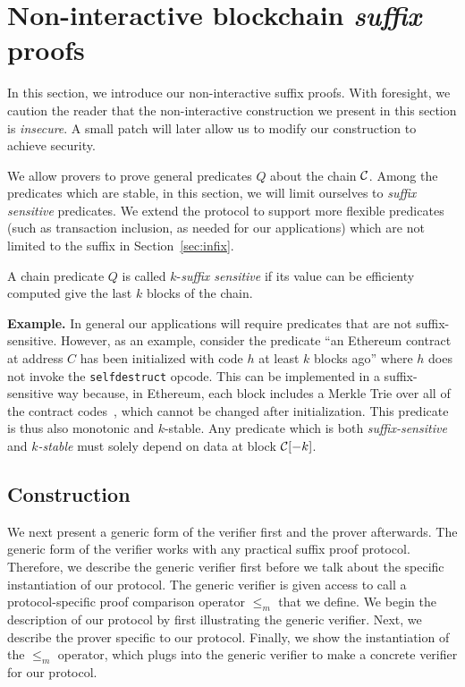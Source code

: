 \section{Non-interactive blockchain \emph{suffix} proofs}\label{sec:suffix}
In this section, we introduce our non-interactive suffix proofs. With foresight,
we caution the reader that the non-interactive construction we present in this
section is \emph{insecure}. A small patch will later allow us to modify our
construction to achieve security.

We allow provers to prove general predicates $Q$ about the chain $\mathcal{C}$.
Among the predicates which are stable, in this section, we will limit ourselves
to \emph{suffix sensitive} predicates.
We extend the protocol to support more flexible predicates
(such as transaction inclusion, as needed for our applications) which are not
limited to the suffix in Section~\ref{sec:infix}.

\begin{definition}
A chain predicate $Q$ is called $k$-\emph{suffix sensitive} if its value
can be efficienty computed give the last $k$ blocks of the chain.
\end{definition}

\noindent\textbf{Example.}
In general our applications will require predicates that are not
suffix-sensitive. However, as an example, consider the predicate ``an Ethereum
contract at address $C$ has been initialized with code $h$ at least $k$ blocks
ago'' where $h$ does not invoke the \texttt{selfdestruct} opcode. This can be
implemented in a suffix-sensitive way because, in Ethereum, each block includes
a Merkle Trie over all of the contract codes~\cite{vitalik,wood}, which cannot be
changed after initialization. This predicate is thus also monotonic and
$k$-stable. Any predicate which is both \emph{suffix-sensitive} and
\emph{$k$-stable} must solely depend on data at block $\mathcal{C}[-k]$.

\subsection{Construction}
We next present a generic form of the verifier first and the prover afterwards.
The generic form of the verifier works with any practical suffix proof protocol.
Therefore, we describe the generic verifier first before we talk about the
specific instantiation of our protocol. The generic verifier is given access to
call a protocol-specific proof comparison operator $\leq_m$ that we define. We
begin the description of our protocol by first illustrating the generic
verifier. Next, we describe the prover specific to our protocol. Finally, we
show the instantiation of the $\leq_m$ operator, which plugs into the generic
verifier to make a concrete verifier for our protocol.

